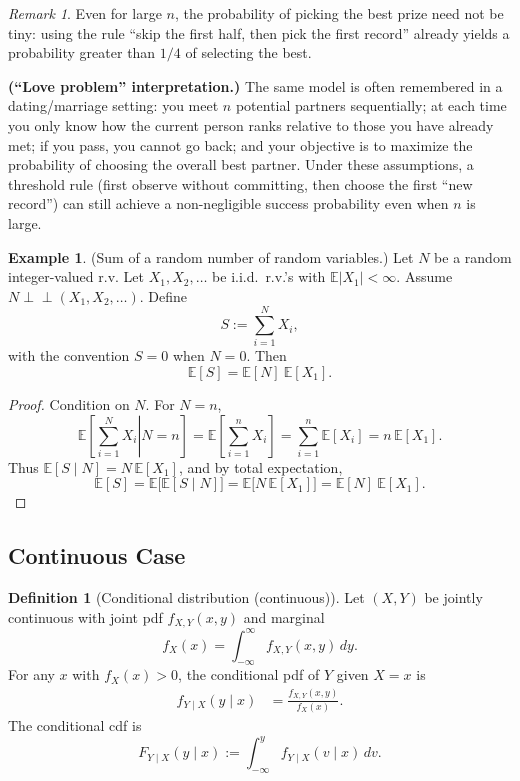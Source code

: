 \documentclass[11pt]{article}
\theoremstyle{plain}
\theoremstyle{definition}
\newtheorem{definition}[theorem]{Definition}
\newtheorem{example}[theorem]{Example}
\theoremstyle{remark}
\newtheorem{remark}[theorem]{Remark}
\begin{document}
	\begin{remark}
		Even for large \(n\), the probability of picking the best prize need not be tiny: using the rule ``skip the first half, then pick the
		first record'' already yields a probability greater than \(1/4\) of selecting the best.
		
		\medskip
		\noindent
		\textbf{(``Love problem'' interpretation.)}
		The same model is often remembered in a dating/marriage setting: you meet \(n\) potential partners sequentially; at each time you only
		know how the current person ranks relative to those you have already met; if you pass, you cannot go back; and your objective is to
		maximize the probability of choosing the overall best partner.
		Under these assumptions, a threshold rule (first observe without committing, then choose the first ``new record'') can still achieve a
		non-negligible success probability even when \(n\) is large.
	\end{remark}
	
	
	\begin{example}
		(Sum of a random number of random variables.)
		Let \(N\) be a random integer-valued r.v.
		Let \(X_1,X_2,\dots\) be i.i.d.\ r.v.'s with \(\mathbb{E}|X_1|<\infty\).
		Assume \(N\perp\!\!\!\perp (X_1,X_2,\dots)\).
		Define
		\[
		S:=\sum_{i=1}^{N} X_i,
		\]
		with the convention \(S=0\) when \(N=0\).
		Then
		\[
		\mathbb{E}[S]=\mathbb{E}[N]\ \mathbb{E}[X_1].
		\]
	\end{example}
	
	\begin{proof}
		Condition on \(N\). For \(N=n\),
		\[
		\mathbb{E}\!\left[\left.\sum_{i=1}^{N}X_i\right|N=n\right]
		=\mathbb{E}\!\left[\sum_{i=1}^{n}X_i\right]
		=\sum_{i=1}^{n}\mathbb{E}[X_i]
		=n\,\mathbb{E}[X_1].
		\]
		Thus \(\mathbb{E}[S\mid N]=N\,\mathbb{E}[X_1]\), and by total expectation,
		\[
		\mathbb{E}[S]=\mathbb{E}\!\big[\mathbb{E}[S\mid N]\big]
		=\mathbb{E}\big[N\,\mathbb{E}[X_1]\big]
		=\mathbb{E}[N]\ \mathbb{E}[X_1].
		\]
	\end{proof}
	
	
	
	
	
	\subsection{Continuous Case}
	
	\begin{definition}[Conditional distribution (continuous)]
		Let \((X,Y)\) be jointly continuous with joint pdf \(f_{X,Y}(x,y)\) and marginal
		\[
		f_X(x)=\int_{-\infty}^{\infty} f_{X,Y}(x,y)\,dy.
		\]
		For any \(x\) with \(f_X(x)>0\), the conditional pdf of \(Y\) given \(X=x\) is
		\begin{align*}
			f_{Y\mid X}(y\mid x)
			&=\frac{f_{X,Y}(x,y)}{f_X(x)}.
		\end{align*}
		The conditional cdf is
		\[
		F_{Y\mid X}(y\mid x):=\int_{-\infty}^{y} f_{Y\mid X}(v\mid x)\,dv.
		\]
	\end{definition}
	
\end{document}
